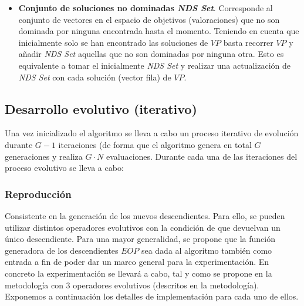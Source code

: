 \begin{itemize}
\item \textbf{Conjunto de soluciones no dominadas \textit{NDS Set}}. Corresponde al conjunto de vectores en el espacio de objetivos (valoraciones) que no son dominada por ninguna encontrada hasta el momento. Teniendo en cuenta que inicialmente solo se han encontrado las soluciones de $VP$ basta recorrer $VP$ y añadir \textit{NDS Set} aquellas que no son dominadas por ninguna otra. Esto es equivalente a tomar el inicialmente \textit{NDS Set} y realizar una actualización de \textit{NDS Set} con cada solución (vector fila) de $VP$.\\

\end{itemize}

\subsection{Desarrollo evolutivo (iterativo)}

Una vez inicializado el algoritmo se lleva a cabo un proceso iterativo de evolución durante $G-1$ iteraciones (de forma que el algoritmo genera en total $G$ generaciones y realiza $G \cdot N$ evaluaciones. Durante cada una de las iteraciones del proceso evolutivo se lleva a cabo:

\subsubsection{Reproducción}

Consistente en la generación de los nuevos descendientes. Para ello, se pueden utilizar distintos operadores evolutivos con la condición de que devuelvan un único descendiente. Para una mayor generalidad, se propone que la función generadora de los descendientes $EOP$ sea dada al algoritmo también como entrada a fin de poder dar un marco general para la experimentación. En concreto la experimentación se llevará a cabo, tal y como se propone en la metodología con 3 operadores evolutivos (descritos en la metodología). Exponemos a continuación los detalles de implementación para cada uno de ellos.\\

